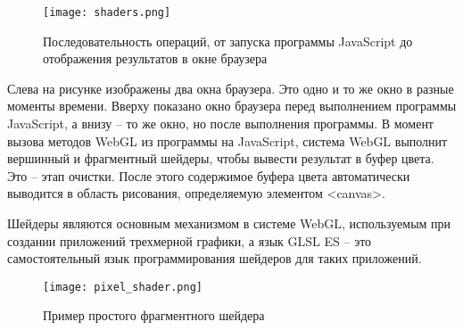 \begin{figure}[ht]
\centering
  \texttt{[image: shaders.png]}
  \caption{Последовательность операций, от запуска программы JavaScript до отображения результатов в окне браузера}
  \label{figure:domain:shaders}
\end{figure}

Слева на рисунке  изображены два окна браузера. Это одно и то же окно в разные моменты времени. Вверху показано окно браузера перед выполнением программы JavaScript,
а внизу – то же окно, но после выполнения программы. В момент вызова методов WebGL из программы на JavaScript, система WebGL выполнит вершинный и фрагментный шейдеры, 
чтобы вывести результат в буфер цвета. Это – этап очистки. После этого содержимое буфера цвета автоматически выводится в область рисования, определяемую элементом <canvas>.

Шейдеры являются основным механизмом в системе WebGL, используемым при создании приложений трехмерной графики, а язык GLSL ES –
это самостоятельный язык программирования шейдеров для таких приложений. 

\begin{figure}[ht]
\centering
  \texttt{[image: pixel\_shader.png]}
  \caption{Пример простого фрагментного шейдера}
  \label{figure:domain:pixel_shader}
\end{figure}

